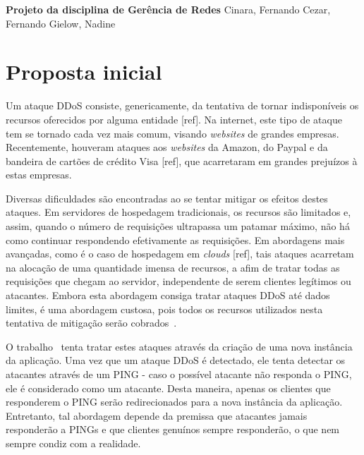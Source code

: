 \documentclass[a4paper, 11pt]{article}
\begin{document}
{
\begin{center}
{\LARGE \textbf{Projeto da disciplina de Gerência de Redes}}
\vskip 0.5cm
{\Large Cinara, Fernando Cezar, Fernando Gielow, Nadine}
\end{center}
}

\section{Proposta inicial}

Um ataque DDoS consiste, genericamente, da tentativa de tornar indisponíveis os recursos oferecidos por alguma entidade [ref]. Na internet, este tipo de ataque tem se tornado cada vez mais comum, visando \emph{websites} de grandes empresas. Recentemente, houveram ataques aos \emph{websites} da Amazon, do Paypal e da bandeira de cartões de crédito Visa [ref], que acarretaram em grandes prejuízos à estas empresas.

Diversas dificuldades são encontradas ao se tentar mitigar os efeitos destes ataques. Em servidores de hospedagem tradicionais, os recursos são limitados e, assim, quando o número de requisições ultrapassa um patamar máximo, não há como continuar respondendo efetivamente as requisições. Em abordagens mais avançadas, como é o caso de hospedagem em \emph{clouds} [ref], tais ataques acarretam na alocação de uma quantidade imensa de recursos, a afim de tratar todas as requisições que chegam ao servidor, independente de serem clientes legítimos ou atacantes. Embora esta abordagem consiga tratar ataques DDoS até dados limites, é uma abordagem custosa, pois todos os recursos utilizados nesta tentativa de mitigação serão cobrados~\cite{Khor:2009p24701}.

O trabalho~\cite{Bakshi:2010p24702} tenta tratar estes ataques através da criação de uma nova instância da aplicação. Uma vez que um ataque DDoS é detectado, ele tenta detectar os atacantes através de um PING - caso o possível atacante não responda o PING, ele é considerado como um atacante. Desta maneira, apenas os clientes que responderem o PING serão redirecionados para a nova instância da aplicação. Entretanto, tal abordagem depende da premissa que atacantes jamais responderão a PINGs e que clientes genuínos sempre responderão, o que nem sempre condiz com a realidade. 
\end{document}
